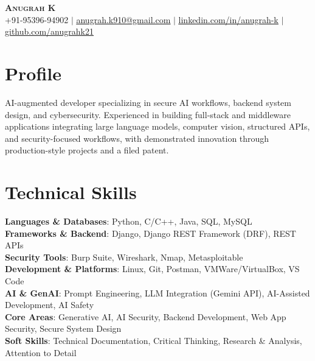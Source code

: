 \documentclass[letterpaper,10pt]{article}
\begin{document}
\begin{center}
    \textbf{\Huge \scshape Anugrah K} \\ \vspace{1pt}
    \small +91-95396-94902 $|$ \href{mailto:anugrah.k910@gmail.com}{\underline{anugrah.k910@gmail.com}} $|$ 
    \href{https://linkedin.com/in/anugrah-k}{\underline{linkedin.com/in/anugrah-k}} $|$
    \href{https://github.com/anugrahk21}{\underline{github.com/anugrahk21}}
\end{center}

\section{Profile}
    \begin{itemize}[leftmargin=0.15in, label={}]
    \small{\item{
    AI-augmented developer specializing in secure AI workflows, backend system design, and cybersecurity. Experienced in building full-stack and middleware applications integrating large language models, computer vision, structured APIs, and security-focused workflows, with demonstrated innovation through production-style projects and a filed patent.
    }}
\end{itemize}

\section{Technical Skills}
 \begin{itemize}[leftmargin=0.15in, label={}]
    \small{\item{
     \textbf{Languages \& Databases}{: Python, C/C++, Java, SQL, MySQL} \\
    \textbf{Frameworks \& Backend}{: Django, Django REST Framework (DRF), REST APIs} \\
    \textbf{Security Tools}{: Burp Suite, Wireshark, Nmap, Metasploitable} \\
    \textbf{Development \& Platforms}{: Linux, Git, Postman, VMWare/VirtualBox, VS Code} \\
    \textbf{AI \& GenAI}{: Prompt Engineering, LLM Integration (Gemini API), AI-Assisted Development, AI Safety} \\
    \textbf{Core Areas}{: Generative AI, AI Security, Backend Development, Web App Security, Secure System Design} \\
    \textbf{Soft Skills}{: Technical Documentation, Critical Thinking, Research \& Analysis, Attention to Detail}}}
 \end{itemize}
\end{document}
